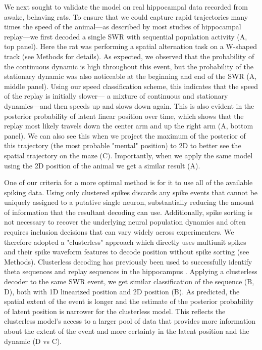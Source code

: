 \documentclass[9pt,lineno]{elife}
\begin{document}
We next sought to validate the model on real hippocampal data recorded from awake, behaving rats. To ensure that we could capture rapid trajectories many times the speed of the animal---as described by most studies of hippocampal replay---we first decoded a single SWR with sequential population activity (A, top panel). Here the rat was performing a spatial alternation task on a W-shaped track (see Methods for details). As expected, we observed that the probability of the continuous dynamic is high throughout this event, but the probability of the stationary dynamic was also noticeable at the beginning and end of the SWR (A, middle panel). Using our speed classification scheme, this indicates that the speed of the replay is initially slower--- a mixture of continuous and stationary dynamics---and then speeds up and slows down again. This is also evident in the posterior probability of latent linear position over time, which shows that the replay most likely travels down the center arm and up the right arm (A, bottom panel). We can also see this when we project the maximum of the posterior of this trajectory (the most probable "mental" position) to 2D to better see the spatial trajectory on the maze (C). Importantly, when we apply the same model using the 2D position of the animal we get a similar result (A).

One of our criteria for a more optimal method is for it to use all of the available spiking data. Using only clustered spikes discards any spike events that cannot be uniquely assigned to a putative single neuron, substantially reducing the amount of information that the resultant decoding can use. Additionally, spike sorting is not necessary to recover the underlying neural population dynamics \citep{TrautmannAccurateEstimationNeural2019} and often requires inclusion decisions that can vary widely across experimenters. We therefore adopted a "clusterless" approach which directly uses multiunit spikes and their spike waveform features to decode position without spike sorting (see Methods). Clusterless decoding has previously been used to successfully identify theta sequences and replay sequences in the hippocampus \citep{KloostermanBayesiandecodingusing2014, ChenTransductiveneuraldecoding2012,DengRapidclassificationhippocampal2016, KayConstantSubsecondCycling2020}. Applying a clusterless decoder to the same SWR event, we get similar classification of the sequence (B, D), both with 1D linearized position and 2D position (B). As predicted, the spatial extent of the event is longer and the estimate of the posterior probability of latent position is narrower for the clusterless model. This reflects the clusterless model's access to a larger pool of data that provides more information about the extent of the event and more certainty in the latent position and the dynamic (D vs C).
\end{document}
